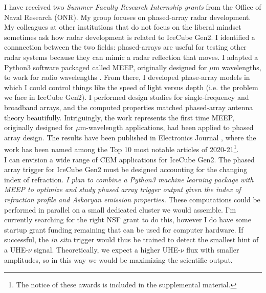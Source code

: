 \documentclass[../../../main.tex]{subfiles}
\begin{document}
I have received two \textit{Summer Faculty Research Internship grants} from the Office of Naval Research (ONR).  My group focuses on phased-array radar development.  My colleagues at other institutions that do not focus on the liberal mindset sometimes ask how radar development is related to IceCube Gen2.  I identified a connnection between the two fields: phased-arrays are useful for testing other radar systems because they can mimic a radar reflection that moves.  I adapted a Python3 software packaged called MEEP, originally designed for $\mu$m wavelengths, to work for radio wavelengths \cite{10.1016/j.cpc.2009.11.008}.  From there, I developed phase-array models in which I could control things like the speed of light versus depth (i.e. the problem we face in IceCube Gen2).  I performed design studies for single-frequency and broadband arrays, and the computed properties matched phased-array antenna theory beautifully.  Intriguingly, the work represents the first time MEEP, originally designed for $\mu$m-wavelength applications, had been applied to phased array design.  The results have been published in Electronics Journal \cite{electronics10040415}, where the work has been named among the Top 10 most notable articles of 2020-21\footnote{The notice of these awards is included in the supplemental material.}.
\\
\vspace{0.25cm}
I can envision a wide range of CEM applications for IceCube Gen2.  The phased array trigger for IceCube Gen2 must be designed accounting for the changing index of refraction.  \textit{I plan to combine a Python3 machine learning package with MEEP to optimize and study phased array trigger output given the index of refraction profile and Askaryan emission properties.}  These computations could be performed in parallel on a small dedicated cluster we would assemble.  I'm currently searching for the right NSF grant to do this, however I do have some startup grant funding remaining that can be used for computer hardware.  If successful, the \textit{in situ} trigger would thus be trained to detect the smallest hint of a UHE-$\nu$ signal.  Theoretically, we expect a higher UHE-$\nu$ flux with smaller amplitudes, so in this way we would be maximizing the scientific output.
\\
\vspace{0.25cm}
\end{document}
